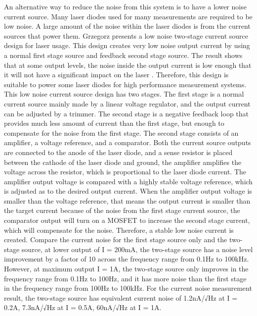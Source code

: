 An alternative way to reduce the noise from this system is to have a lower noise current source.  Many laser diodes used for many measurements are required to be low noise.  A large amount of the noise within the laser diodes is from the current sources that power them.  Grzegorz \cite{LowNoiseCurrentSource} presents a low noise two-stage current source design for laser usage.  This design creates very low noise output current by using a normal first stage source and feedback second stage source.  The result shows that at some output levels, the noise inside the output current is low enough that it will not have a significant impact on the laser \cite{LinewidthQuantumCascadeLaser}.  Therefore, this design is suitable to power some laser diodes for high performance measurement systems.
This low noise current source design has two stages.  The first stage is a normal current source mainly made by a linear voltage regulator, and the output current can be adjusted by a trimmer.  The second stage is a negative feedback loop that provides much less amount of current than the first stage, but enough to compensate for the noise from the first stage.  The second stage consists of an amplifier, a voltage reference, and a comparator.  Both the current source outputs are connected to the anode of the laser diode, and a sense resistor is placed between the cathode of the laser diode and ground, the amplifier amplifies the voltage across the resistor, which is proportional to the laser diode current.  The amplifier output voltage is compared with a highly stable voltage reference, which is adjusted as to the desired output current.  When the amplifier output voltage is smaller than the voltage reference, that means the output current is smaller than the target current because of the noise from the first stage current source, the comparator output will turn on a MOSFET to increase the second stage current, which will compensate for the noise.  Therefore, a stable low noise current is created.
Compare the current noise for the first stage source only and the two-stage source, at lower output of I = 200mA, the two-stage source has a noise level improvement by a factor of 10 across the frequency range from 0.1Hz to 100kHz.  However, at maximum output I = 1A, the two-stage source only improves in the frequency range from 0.1Hz to 100Hz, and it has more noise than the first stage in the frequency range from 100Hz to 100kHz.
For the current noise measurement result, the two-stage source has equivalent current noise of 1.2nA/√Hz at I = 0.2A, 7.3nA/√Hz at I = 0.5A, 60nA/√Hz at I = 1A.
